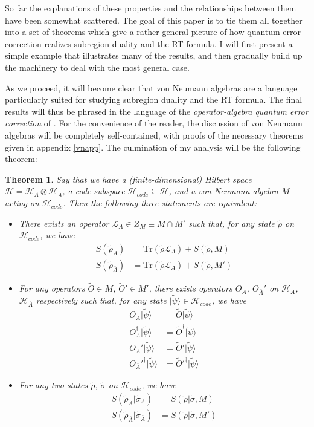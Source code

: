 \documentclass[12pt]{article}
\newcommand{\bi}{\begin{itemize}}
\newcommand{\ei}{\end{itemize}}
\newcommand{\ran}{\rangle}
\newcommand{\Tr}{\mathrm{Tr}}
\newcommand{\wt}{\widetilde}
\newcommand{\Ll}{\mathcal{L}}
\newcommand{\Hh}{\mathcal{H}}
\newcommand{\HA}{\mathcal{H}_A}
\newcommand{\HAb}{\mathcal{H}_{\ol{A}}}
\newcommand{\Ab}{\ol{A}}
\newcommand{\Hc}{\mathcal{H}_{code}}
\newcommand{\LA}{\Ll_A}
\newcommand{\ol}{\overline}
\newtheorem{thm}{Theorem}[section]
\begin{document}
So far the explanations of these properties and the relationships between them have been somewhat scattered. The goal of this paper is to tie them all together into a set of theorems which give a rather general picture of how quantum error correction realizes subregion duality and the RT formula.  I will first present a simple example that illustrates many of the results, and then gradually build up the machinery to deal with the most general case. 

As we proceed, it will become clear that von Neumann algebras are a language particularly suited for studying subregion duality and the RT formula.  The final results will thus be phrased in the language of the \textit{operator-algebra quantum error correction} of \cite{beny2007generalization,beny2007quantum}.  For the convenience of the reader, the discussion of von Neumann algebras will be completely self-contained, with proofs of the necessary theorems given in appendix \ref{vnapp}. The culmination of my analysis will be the following theorem: 
\begin{thm}\label{bigrthm}
Say that we have a (finite-dimensional) Hilbert space $\Hh=\HA\otimes \HAb$, a code subspace $\Hc\subseteq\Hh$, and a von Neumann algebra $M$ acting on $\Hc$.  Then the following three statements are equivalent:
\bi
\item There exists an operator $\LA\in Z_M\equiv M\cap M'$ such that, for any state $\wt{\rho}$ on $\Hc$, we have
\begin{align}\nonumber
S(\wt{\rho}_A)&=\Tr \left(\wt{\rho} \LA\right)+S(\wt{\rho},M)\\\nonumber
S(\wt{\rho}_{\Ab})&=\Tr \left(\wt{\rho} \LA\right)+S(\wt{\rho},M')
\end{align}

\item For any operators $\wt{O}\in M$, $\wt{O}'\in M'$, there exists operators $O_A$, $O_{\Ab}'$ on $\HA$, $\HAb$ respectively such that, for any state $|\wt{\psi}\ran\in \Hc$, we have
\begin{align}\nonumber
O_A|\wt{\psi}\ran&=\wt{O}|\wt{\psi}\ran\\\nonumber
O_A^\dagger|\wt{\psi}\ran&=\wt{O}^\dagger|\wt{\psi}\ran\\\nonumber
O_{\Ab}'|\wt{\psi}\ran&=\wt{O}'|\wt{\psi}\ran\\\nonumber
O_{\Ab}'^\dagger|\wt{\psi}\ran&=\wt{O}'^\dagger|\wt{\psi}\ran
\end{align}

\item For any two states $\wt{\rho}$, $\wt{\sigma}$ on $\Hc$, we have
\begin{align}\nonumber
S\left(\wt{\rho}_A|\wt{\sigma}_A\right)&=S(\wt{\rho}|\wt{\sigma},M)\\
S\left(\wt{\rho}_{\Ab}|\wt{\sigma}_{\Ab}\right)&=S(\wt{\rho}|\wt{\sigma},M')\nonumber
\end{align}
\ei
\end{thm}
\end{document}
